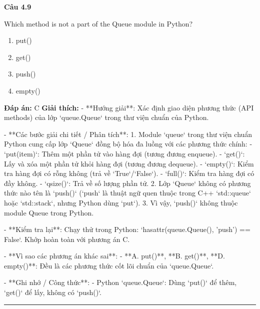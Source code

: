 \documentclass[11pt,a4paper]{article}
\newenvironment{question}[1]{%
  \par\vspace{1em}\noindent\textbf{\large Câu #1}\par\vspace{0.4em}
}{%
  \par\vspace{1em}\hrule\vspace{0.6em}
}
\newenvironment{choices}{%
  \begin{enumerate}[label=\textbf{\Alph*.},leftmargin=2.2em,itemsep=2pt,topsep=3pt]
}{%
  \end{enumerate}
}
\newcommand{\choice}{\item}
\begin{document}
\begin{question}{4.9}
Which method is not a part of the Queue module in Python?
\begin{choices}
\choice put()
\choice get()
\choice push()
\choice empty()
\end{choices}
\textbf{Đáp án:} C
\textbf{Giải thích:} - **Hướng giải**:
  Xác định giao diện phương thức (API methods) của lớp `queue.Queue` trong thư viện chuẩn của Python.

- **Các bước giải chi tiết / Phân tích**:
  1. Module `queue` trong thư viện chuẩn Python cung cấp lớp `Queue` đồng bộ hóa đa luồng với các phương thức chính:
     - `put(item)`: Thêm một phần tử vào hàng đợi (tương đương enqueue).
     - `get()`: Lấy và xóa một phần tử khỏi hàng đợi (tương đương dequeue).
     - `empty()`: Kiểm tra hàng đợi có rỗng không (trả về `True`/`False`).
     - `full()`: Kiểm tra hàng đợi có đầy không.
     - `qsize()`: Trả về số lượng phần tử.
  2. Lớp `Queue` không có phương thức nào tên là `push()` (`push` là thuật ngữ quen thuộc trong C++ `std::queue` hoặc `std::stack`, nhưng Python dùng `put`).
  3. Vì vậy, `push()` không thuộc module Queue trong Python.

- **Kiểm tra lại**:
  Chạy thử trong Python: `hasattr(queue.Queue(), 'push') == False`.
  Khớp hoàn toàn với phương án C.

- **Vì sao các phương án khác sai**:
  - **A. put()**, **B. get()**, **D. empty()**: Đều là các phương thức cốt lõi chuẩn của `queue.Queue`.

- **Ghi nhớ / Công thức**:
  - Python `queue.Queue`: Dùng `put()` để thêm, `get()` để lấy, không có `push()`.
\end{question}
\end{document}
